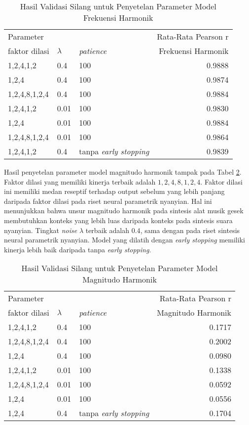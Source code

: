 \begin{table}[h]
    \centering
    \caption{Hasil Validasi Silang untuk Penyetelan Parameter Model Frekuensi Harmonik}\label{tab-freq-model-tuning-results}
    \begin{tabular}{ |l|l|l|r| } 
     \hline
     \multicolumn{3}{|l|}{Parameter} & Rata-Rata Pearson r\\
     \cline{1-3}
     faktor dilasi & $\lambda$ & \textit{patience} &Frekuensi Harmonik \\
	 \hline 
	1,2,4,1,2 & 0.4 &100           &0.9888\\\hline
	1,2,4 & 0.4 &100               &0.9874\\\hline
	1,2,4,8,1,2,4 & 0.4 &100       &0.9884\\\hline
	1,2,4,1,2 & 0.01 &100          &0.9830\\\hline
	1,2,4 & 0.01 &100              &0.9884\\\hline
	1,2,4,8,1,2,4 & 0.01 &100      &0.9864\\\hline
	1,2,4,1,2 & 0.4 &tanpa \textit{early stopping}   &0.9839\\\hline
    \end{tabular}
\end{table}

Hasil penyetelan parameter model magnitudo harmonik tampak pada Tabel \ref{tab-mag-model-tuning-results}. Faktor dilasi yang memiliki kinerja terbaik adalah $1,2,4,8,1,2,4$. Faktor dilasi ini memiliki medan reseptif terhadap output sebelum yang lebih panjang daripada faktor dilasi pada riset neural parametrik nyanyian. Hal ini menunjukkan bahwa unsur magnitudo harmonik pada sintesis alat musik gesek membutuhkan konteks yang lebih luas daripada konteks pada sintesis suara nyanyian. Tingkat \textit{noise} $\lambda$ terbaik adalah $0.4$, sama dengan pada riset sintesis neural parametrik nyanyian. Model yang dilatih dengan \textit{early stopping} memiliki kinerja lebih baik daripada tanpa \textit{early stopping}.

\begin{table}[h]
    \centering
    \caption{Hasil Validasi Silang untuk Penyetelan Parameter Model Magnitudo Harmonik}\label{tab-mag-model-tuning-results}
    \begin{tabular}{ |l|l|l|r| } 
     \hline
     \multicolumn{3}{|l|}{Parameter} & Rata-Rata Pearson r\\
     \cline{1-3}
     faktor dilasi & $\lambda$ & \textit{patience} & Magnitudo Harmonik\\
	 \hline 
	1,2,4,1,2 & 0.4 &100           &0.1717\\\hline
	1,2,4,8,1,2,4 & 0.4 &100       &0.2002\\\hline
	1,2,4 & 0.4 &100               &0.0980\\\hline
	1,2,4,1,2 & 0.01 &100          &0.1338\\\hline
	1,2,4,8,1,2,4 & 0.01 &100      &0.0592\\\hline
	1,2,4 & 0.01 &100              &0.0556\\\hline
	1,2,4 & 0.4 &tanpa \textit{early stopping}       &0.1704\\\hline
    \end{tabular}
\end{table}

